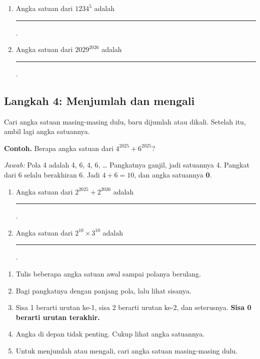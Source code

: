 \documentclass[11pt,a4paper]{article}
\newcommand{\kosong}{\rule{1.2cm}{0.4pt}}
\begin{document}
\begin{giliranmu}
\begin{enumerate}[label=\alph*.]
    \item Angka satuan dari $1234^{5}$ adalah \kosong.
    \item Angka satuan dari $2029^{2026}$ adalah \kosong.
\end{enumerate}
\end{giliranmu}

\subsection*{Langkah 4: Menjumlah dan mengali}
Cari angka satuan masing-masing dulu, baru dijumlah atau dikali. Setelah itu, ambil lagi
angka satuannya.

\begin{contoh}
\textbf{Contoh.} Berapa angka satuan dari $4^{2025} + 6^{2025}$?

\textit{Jawab:} Pola 4 adalah 4, 6, 4, 6, \dots{} Pangkatnya ganjil, jadi satuannya 4.
Pangkat dari 6 selalu berakhiran 6. Jadi $4 + 6 = 10$, dan angka satuannya \textbf{0}.
\end{contoh}

\begin{giliranmu}
\begin{enumerate}[label=\alph*.]
    \item Angka satuan dari $2^{2025} + 2^{2026}$ adalah \kosong.
    \item Angka satuan dari $2^{10} \times 3^{10}$ adalah \kosong.
\end{enumerate}
\end{giliranmu}

\begin{rangkuman}
\begin{enumerate}
    \item Tulis beberapa angka satuan awal sampai polanya berulang.
    \item Bagi pangkatnya dengan panjang pola, lalu lihat sisanya.
    \item Sisa 1 berarti urutan ke-1, sisa 2 berarti urutan ke-2, dan seterusnya.
          \textbf{Sisa 0 berarti urutan terakhir.}
    \item Angka di depan tidak penting. Cukup lihat angka satuannya.
    \item Untuk menjumlah atau mengali, cari angka satuan masing-masing dulu.
\end{enumerate}
\end{rangkuman}
\end{document}
